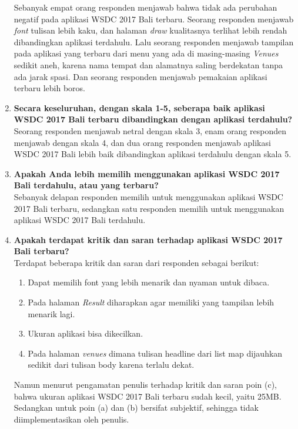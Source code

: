 \begin{enumerate}
	Sebanyak empat orang responden menjawab bahwa tidak ada perubahan negatif pada aplikasi WSDC 2017 Bali terbaru. Seorang responden menjawab \textit{font} tulisan lebih kaku, dan halaman \textit{draw} kualitasnya terlihat lebih rendah dibandingkan aplikasi terdahulu. Lalu seorang responden menjawab tampilan pada aplikasi yang terbaru dari menu yang ada di masing-masing \textit{Venues} sedikit aneh, karena nama tempat dan alamatnya saling berdekatan tanpa ada jarak spasi. Dan seorang responden menjawab pemakaian aplikasi terbaru lebih boros.
	\item \textbf{Secara keseluruhan, dengan skala 1-5, seberapa baik aplikasi WSDC 2017 Bali terbaru dibandingkan dengan aplikasi terdahulu?} \\
	Seorang responden menjawab netral dengan skala 3, enam orang responden menjawab dengan skala 4, dan dua orang responden menjawab aplikasi WSDC 2017 Bali lebih baik dibandingkan aplikasi terdahulu dengan skala 5.
	\item \textbf{Apakah Anda lebih memilih menggunakan aplikasi WSDC 2017 Bali terdahulu, atau yang terbaru?} \\
	Sebanyak delapan responden memilih untuk menggunakan aplikasi WSDC 2017 Bali terbaru, sedangkan satu responden memilih untuk menggunakan aplikasi WSDC 2017 Bali terdahulu.
	\item \textbf{Apakah terdapat kritik dan saran terhadap aplikasi WSDC 2017 Bali terbaru?} \\
	Terdapat beberapa kritik dan saran dari responden sebagai berikut:
	\begin{enumerate}
		\item Dapat memilih font yang lebih menarik dan nyaman untuk dibaca.
		\item Pada halaman \textit{Result} diharapkan agar memiliki yang tampilan lebih menarik lagi.
		\item Ukuran aplikasi bisa dikecilkan.
		\item Pada halaman \textit{venues} dimana tulisan headline dari list map dijauhkan sedikit dari tulisan body karena terlalu dekat.
	\end{enumerate}
	Namun menurut pengamatan penulis terhadap kritik dan saran poin (c), bahwa ukuran aplikasi WSDC 2017 Bali terbaru sudah kecil, yaitu 25MB. Sedangkan untuk poin (a) dan (b) bersifat subjektif, sehingga tidak diimplementasikan oleh penulis.
\end{enumerate}
